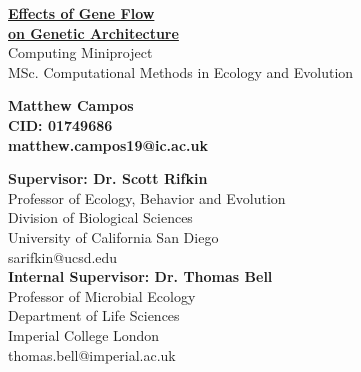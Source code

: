 \begin{titlepage}
    \begin{center}
    \vspace*{1cm}

    \Huge
    \textbf{\underline{Effects of Gene Flow}}\\
    \textbf{\underline{on Genetic Architecture}}\\

    \vspace*{0.5cm}
    \LARGE
    Computing Miniproject\\
    MSc. Computational Methods in Ecology and Evolution\\

    \vspace*{1.5cm}

    \large
    \textbf{Matthew Campos}\\
    \textbf{CID: 01749686}\\
    \textbf{matthew.campos19@ic.ac.uk}\\

    \vspace*{0.8cm}

    \large
    \textbf{Supervisor: Dr. Scott Rifkin}\\
    \scriptsize
    Professor of Ecology, Behavior and Evolution\\
    Division of Biological Sciences\\
    University of California San Diego\\
    sarifkin@ucsd.edu\\

    \large
    \textbf{Internal Supervisor: Dr. Thomas Bell}\\
    \scriptsize
    Professor of Microbial Ecology\\
    Department of Life Sciences\\
    Imperial College London\\
    thomas.bell@imperial.ac.uk\\

    \end{center}
\end{titlepage}
